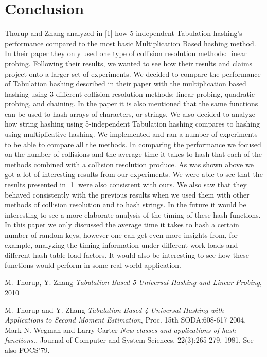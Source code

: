 \documentclass[11pt]{article}
\begin{document}
\section{Conclusion}
Thorup and Zhang analyzed in [1] how 5-independent Tabulation hashing's performance compared to the most basic Multiplication Based hashing method. In their paper they only used one type of collision resolution methods: linear probing. Following their results, we wanted to see how their results and claims project onto a larger set of experiments. We decided to compare the performance of Tabulation hashing described in their paper with the multiplication based hashing using 3 different collision resolution methods: linear probing, quadratic probing, and chaining. In the paper it is also mentioned that the same functions can be used to hash arrays of characters, or strings. We also decided to analyze how string hashing using 5-independent Tabulation hashing compares to hashing using multiplicative hashing. We implemented and ran a number of experiments to be able to compare all the methods. In comparing the performance we focused on the number of collisions and the average time it takes to hash that each of the methods combined with a collision resolution produce. 
As was shown above we got a lot of interesting results from our experiments. We were able to see that the results presented in [1] were also consistent with ours. We also saw that they behaved consistently with the previous results when we used them with other methods of collision resolution and to hash strings. In the future it would be interesting to see a more elaborate analysis of the timing of these hash functions. In this paper we only discussed the average time it takes to hash a certain number of random keys, however one can get even more insights from, for example, analyzing the timing information under different work loads and different hash table load factors. It would also be interesting to see how these functions would perform in some real-world application. 



\begin{thebibliography}{77}

M. Thorup, Y. Zhang
\emph{Tabulation Based 5-Universal Hashing and Linear Probing},
2010

M. Thorup and Y. Zhang 
\emph{Tabulation Based 4-Universal Hashing with Applications to Second Moment Estimation},
Proc. 15th SODA:608-617 2004.
Mark N. Wegman and Larry Carter
\emph{New classes and applications of hash functions.},
Journal of Computer and System Sciences, 22(3):265 279, 1981. See also FOCS'79.
\end{thebibliography}


\end{document}
